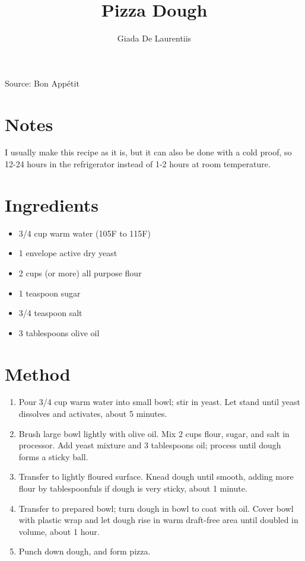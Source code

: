 \documentclass[12pt]{article}
\author{Giada De Laurentiis}
\title{Pizza Dough}
\date{}
\begin{document}
\begin{multicols*}{2}
\maketitle

Source: Bon Appétit

\section{Notes}

I usually make this recipe as it is, but it can also be done with a cold proof, so 12-24 hours in the refrigerator instead of 1-2 hours at room temperature.

\section{Ingredients}

\begin{itemize}
    \item 3/4 cup warm water (105F to 115F)
    \item 1 envelope active dry yeast
    \item 2 cups (or more) all purpose flour
    \item 1 teaspoon sugar
    \item 3/4 teaspoon salt
    \item 3 tablespoons olive oil
\end{itemize}

\section{Method}

\begin{enumerate}
    \item Pour 3/4 cup warm water into small bowl; stir in yeast. Let stand until yeast dissolves and activates, about 5 minutes.
    \item Brush large bowl lightly with olive oil. Mix 2 cups flour, sugar, and salt in processor. Add yeast mixture and 3 tablespoons oil; process until dough forms a sticky ball.
    \item Transfer to lightly floured surface. Knead dough until smooth, adding more flour by tablespoonfuls if dough is very sticky, about 1 minute.
    \item Transfer to prepared bowl; turn dough in bowl to coat with oil. Cover bowl with plastic wrap and let dough rise in warm draft-free area until doubled in volume, about 1 hour.
    \item Punch down dough, and form pizza.
\end{enumerate}

\end{multicols*}
\end{document}
